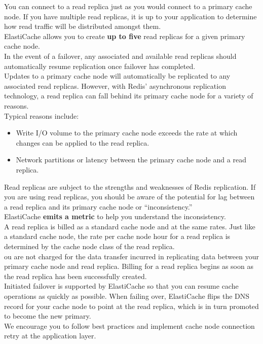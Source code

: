 \documentclass[12pt, letterpaper, twoside]{article}
\begin{document}
You can connect to a read replica just as you would connect to a primary cache node. If you have multiple read replicas, it is up 
to your application to determine how read traffic will be distributed amongst them.\\

ElastiCache allows you to create \textbf{up to five} read replicas for a given primary cache node.\\

In the event of a failover, any associated and available read replicas should automatically resume replication once failover has 
completed.\\

Updates to a primary cache node will automatically be replicated to any associated read replicas. However, with Redis’ 
asynchronous replication technology, a read replica can fall behind its primary cache node for a variety of reasons.\\ 
Typical reasons include:
\begin{itemize}
	\item Write I/O volume to the primary cache node exceeds the rate at which changes can be applied to the read replica.
	\item Network partitions or latency between the primary cache node and a read replica.
\end{itemize}

Read replicas are subject to the strengths and weaknesses of Redis replication. If you are using read replicas, you should be 
aware of the potential for lag between a read replica and its primary cache node or “inconsistency.”\\
ElastiCache \textbf{emits a metric} to help you understand the inconsistency.\\

A read replica is billed as a standard cache node and at the same rates. Just like a standard cache node, the rate per cache node 
hour for a read replica is determined by the cache node class of the read replica.\\
ou are not charged for the data transfer incurred in replicating data between your primary cache node and read replica. Billing 
for a read replica begins as soon as the read replica has been successfully created.\\

Initiated failover is supported by ElastiCache so that you can resume cache operations as quickly as possible. When failing over, 
ElastiCache flips the DNS record for your cache node to point at the read replica, which is in turn promoted to become the new primary.\\
We encourage you to follow best practices and implement cache node connection retry at the application layer.\\
\end{document}
